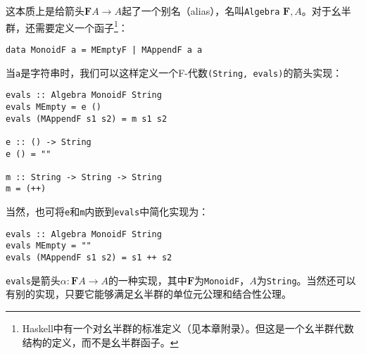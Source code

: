 \documentclass{article}
\begin{document}
\begin{example}
这本质上是给箭头$\mathbf{F}A \to A$起了一个别名（alias），名叫\texttt{Algebra} $\mathbf{F}, A$。对于幺半群，还需要定义一个函子\footnote{
Haskell中有一个对幺半群的标准定义（见本章附录）。但这是一个幺半群代数结构的定义，而不是幺半群函子。}：

\begin{lstlisting}
data MonoidF a = MEmptyF | MAppendF a a
\end{lstlisting}

当\texttt{a}是字符串时，我们可以这样定义一个F-代数\texttt{(String, evals)}的箭头实现：

\begin{lstlisting}
evals :: Algebra MonoidF String
evals MEmpty = e ()
evals (MAppendF s1 s2) = m s1 s2

e :: () -> String
e () = ""

m :: String -> String -> String
m = (++)
\end{lstlisting}

当然，也可将\texttt{e}和\texttt{m}内嵌到\texttt{evals}中简化实现为：

\begin{lstlisting}
evals :: Algebra MonoidF String
evals MEmpty = ""
evals (MAppendF s1 s2) = s1 ++ s2
\end{lstlisting}

\texttt{evals}是箭头$\alpha : \mathbf{F}A \to A$的一种实现，其中$\mathbf{F}$为\texttt{MonoidF}，$A$为\texttt{String}。当然还可以有别的实现，只要它能够满足幺半群的单位元公理和结合性公理。
\end{example}
\end{document}
